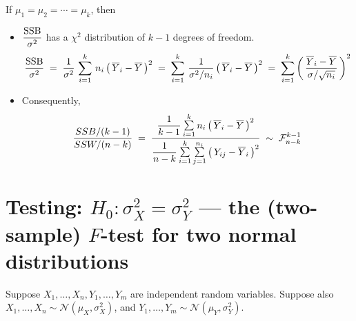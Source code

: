 \documentclass{article}
\begin{document}
\begin{theorem}\quad
If $\mu_{1} = \mu_{2} = \cdots = \mu_{k}$, then
\begin{itemize}
    \item  $\dfrac{\textnormal{SSB}}{\sigma^{2}}$ has a $\chi^{2}$ distribution of $k-1$ degrees of freedom.
              \begin{equation*}
                   \dfrac{\textnormal{SSB}}{\sigma^{2}}
                   \; = \;
                   \dfrac{1}{\sigma^{2}}\,\sum^{k}_{i=1}\,n_{i}\left(\,\overline{Y}_{i}-\overline{Y}\,\right)^{2}
                   \; = \;
                   \sum^{k}_{i=1} \, \dfrac{1}{\sigma^{2}/n_{i}} \left(\,\overline{Y}_{i}-\overline{Y}\,\right)^{2}
                   \; = \;
                   \sum^{k}_{i=1} \left(\,\dfrac{\overline{Y}_{i}-\overline{Y}}{\sigma/\sqrt{n_{i}}}\,\right)^{2}
              \end{equation*}
    \item  Consequently,
              \begin{equation*}
                  \dfrac{SSB/(k-1)}{SSW/(n-k)}
                  \; = \;
                  \dfrac{
                      \dfrac{1}{k-1}\,
                      \underset{i=1}{\overset{k}{\textnormal{\large$\sum$}}}\,
                      n_{i}\left(\,\overline{Y}_{i}-\overline{Y}\,\right)^{2}
                  }{
                      \dfrac{1}{n-k}\,
                      \underset{i=1}{\overset{k}{\textnormal{\large$\sum$}}}\,
                      \underset{j=1}{\overset{n_{i}}{\textnormal{\large$\sum$}}}
                      \left(\,Y_{ij} - \overline{Y}_{i}\,\right)^{2}
                  }
                  \; \sim \; \mathcal{F}^{k-1}_{n-k}
              \end{equation*}
\end{itemize}
\end{theorem}


\section{Testing: $H_{0} : \sigma^{2}_{X} = \sigma^{2}_{Y}$ --- the (two-sample) $F$-test for two normal distributions}
\setcounter{theorem}{0}

Suppose $X_{1},\ldots,X_{n},Y_{1},\ldots,Y_{m}$ are independent random variables.  Suppose also $X_{1},\ldots,X_{n} \sim \mathcal{N}(\mu_{X},\sigma^{2}_{X})$, and $Y_{1},\ldots,Y_{m} \sim \mathcal{N}(\mu_{Y},\sigma^{2}_{Y})$.
\end{document}
